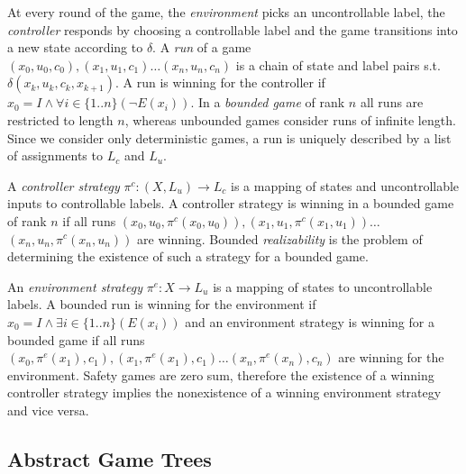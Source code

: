\documentclass{llncs}
\begin{document}
At every round of the game, the \emph{environment} picks an
uncontrollable label, the \emph{controller} responds by choosing a controllable 
label and the game transitions into a new state according to $\delta$. 
A \emph{run} of a game $(x_0, u_0, c_0), (x_1, u_1, c_1) \dots (x_n, u_n,
c_n)$ is a chain of state and label pairs s.t.\,$\delta(x_k, u_k, c_k, x_{k+1})$. 
A run is winning for the controller if $x_0 = I \land \forall i \in \{1..n\} (\lnot E(x_i))$. 
In a \emph{bounded game} of rank $n$ all runs are restricted to length $n$, whereas unbounded 
games consider runs of infinite length. Since we consider only deterministic games, a run 
is uniquely described by a list of assignments to $L_c$ and $L_u$.

A \emph{controller strategy} $\pi^c : (X, L_u) \to L_c$ is a mapping of states
and uncontrollable inputs to controllable labels. A controller strategy is
winning in a bounded game of rank $n$ if all runs $(x_0, u_0, \pi^c(x_0, u_0)),
(x_1, u_1, \pi^c(x_1, u_1)) \dots$ $(x_n, u_n, \pi^c(x_n, u_n))$ are winning.
Bounded \emph{realizability} is the problem of determining the existence of
such a strategy for a bounded game.

An \emph{environment strategy} $\pi^e : X \to L_u$ is a mapping of states to
uncontrollable labels. A bounded run is winning for the environment if $x_0
= I \land \exists i \in \{1..n\} (E(x_i))$ and an environment strategy is
winning for a bounded game if all runs $(x_0, \pi^e(x_1), c_1), (x_1,
\pi^e(x_1), c_1) \dots (x_n, \pi^e(x_n), c_n)$ are winning for the environment.
Safety games are zero sum, therefore the existence of a winning controller strategy
implies the nonexistence of a winning environment strategy and vice versa.

\subsection{Abstract Game Trees}
\end{document}
